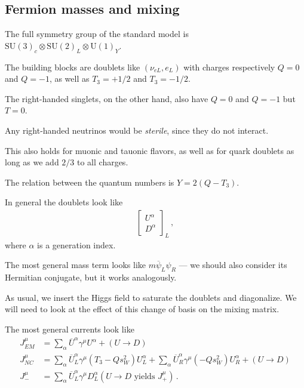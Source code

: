\documentclass[main.tex]{subfiles}
\begin{document}
\subsection{Fermion masses and mixing}


The full symmetry group of the standard model is 
\(\text{SU}(3)_c \otimes \text{SU}(2)_L \otimes \text{U}(1)_Y\). 

The building blocks are doublets like \((\nu_{eL}, e_L)\) with charges respectively
\(Q = 0\) and \(Q= -1\), as well as \(T_3 = +1/2\) and \(T_3 = -1/2\). 

The right-handed singlets, on the other hand, also have \(Q = 0\) and \(Q=-1\) 
but \(T = 0\). 

Any right-handed neutrinos would be \emph{sterile}, since they do not interact. 

This also holds for muonic and tauonic flavors, 
as well as for quark doublets as long as we add \(2/3\) to all charges.

The relation between the quantum numbers is \(Y = 2 (Q-T_3)\). 

In general the doublets look like 
%
\begin{align}
\left[\begin{array}{c}
U^{\alpha } \\ 
D^{\alpha }
\end{array}\right]_L
\,,
\end{align}
%
where \(\alpha \) is a generation index.

The most general mass term looks like \(m \overline{\psi}_L \psi _R\) --- we should also 
consider its Hermitian conjugate, but it works analogously. 

As usual, we insert the Higgs field to saturate the doublets and diagonalize.
We will need to look at the effect of this change of basis on the mixing matrix.

The most general currents look like 
%
\begin{align}
J^{\mu }_{EM} &= \sum _{\alpha } \overline{U}^{\alpha } \gamma^{\mu } U^{\alpha } + (U \to D)  \\
J^{\mu }_{NC} &= \sum _{\alpha } \overline{U}^{\alpha }_{L} \gamma^{\mu } (T_3 - Q s^2_W) U^{\alpha }_{L} 
+ \sum _{\alpha } \overline{U}^{\alpha }_{R} \gamma^{\mu } (- Q s^2_W) U^{\alpha }_{R}  + (U \to D)  \\
J^{\mu }_{-} &= \sum _{\alpha} \overline{U}^{\alpha }_L \gamma^{\mu } D^{\alpha }_{L} (U \to D \text{ yields } J^{\mu }_{+})
\,.
\end{align}
\end{document}
